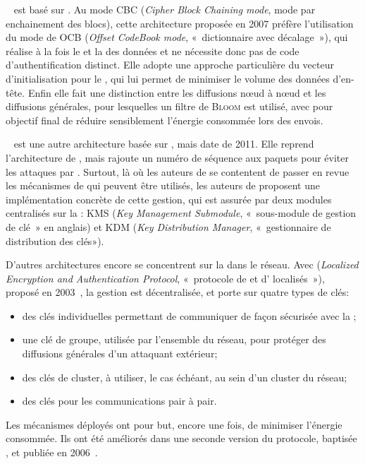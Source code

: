 ~\cite{LMPG07} est basé sur .
Au mode CBC (\textit{Cipher Block Chaining mode}, mode par enchainement des blocs), cette architecture proposée en 2007 préfère l'utilisation du mode de  OCB (\textit{Offset CodeBook mode}, « dictionnaire avec décalage »), qui réalise à la fois le  et la  des données et ne nécessite donc pas de code d'authentification distinct.
Elle adopte une approche particulière du vecteur d'initialisation pour le , qui lui permet de minimiser le volume des données d'en-tête.
Enfin elle fait une distinction entre les diffusions nœud à nœud et les diffusions générales, pour lesquelles un filtre de \textsc{Bloom} est utilisé, avec pour objectif final de réduire sensiblement l'énergie consommée lors des envois.

~\cite{CRS11} est une autre architecture basée sur , mais date de 2011.
Elle reprend l'architecture de , mais rajoute un numéro de séquence aux paquets pour éviter les attaques par .
Surtout, là où les auteurs de  se contentent de passer en revue les mécanismes de  qui peuvent être utilisés, les auteurs de  proposent une implémentation concrète de cette gestion, qui est assurée par deux modules centralisés sur la \sdb: KMS (\textit{Key Management Submodule}, « sous-module de gestion de clé » en anglais) et KDM (\textit{Key Distribution Manager}, « gestionnaire de distribution des clés»).

D'autres architectures encore se concentrent sur la  dans le réseau.
Avec  (\textit{Localized Encryption and Authentication Protocol}, « protocole de  et d' localisés »), proposé en 2003~\cite{ZSJ03}, la gestion est décentralisée, et porte sur quatre types de clés:
\begin{itemize}
    \item des clés individuelles permettant de communiquer de façon sécurisée avec la \sdb;
    \item une clé de groupe, utilisée par l'ensemble du réseau, pour protéger des diffusions générales d'un attaquant extérieur;
    \item des clés de cluster, à utiliser, le cas échéant, au sein d'un cluster du réseau;
    \item des clés pour les communications pair à pair.
\end{itemize}
Les mécanismes déployés ont pour but, encore une fois, de minimiser l'énergie consommée.
Ils ont été améliorés dans une seconde version du protocole, baptisée , et publiée en 2006~\cite{ZSJ06}.


